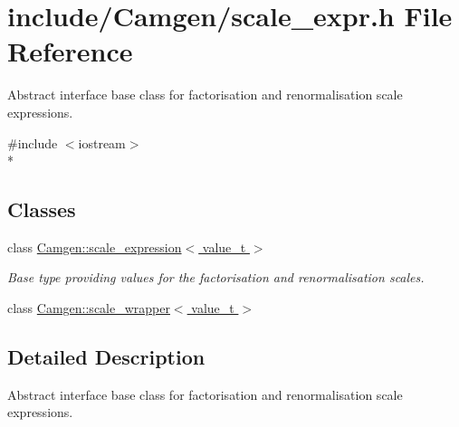 \hypertarget{a00766}{}\section{include/\+Camgen/scale\+\_\+expr.h File Reference}
\label{a00766}


Abstract interface base class for factorisation and renormalisation scale expressions.  


{\ttfamily \#include $<$iostream$>$}\\*
\subsection*{Classes}
\begin{DoxyCompactItemize}
\item 
class \hyperlink{a00502}{Camgen\+::scale\+\_\+expression$<$ value\+\_\+t $>$}
\begin{DoxyCompactList}\small\item\em Base type providing values for the factorisation and renormalisation scales. \end{DoxyCompactList}\item 
class \hyperlink{a00503}{Camgen\+::scale\+\_\+wrapper$<$ value\+\_\+t $>$}
\end{DoxyCompactItemize}


\subsection{Detailed Description}
Abstract interface base class for factorisation and renormalisation scale expressions. 

